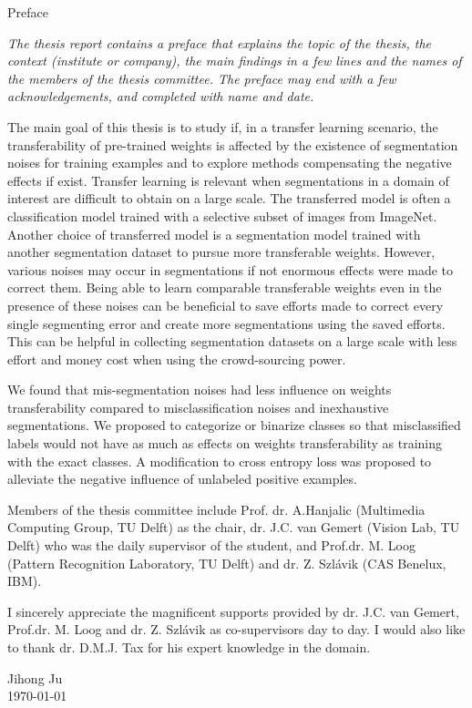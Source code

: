 Preface

\noindent \textit{The thesis report contains a preface that explains the topic of the thesis, the context (institute or company), the main findings in a few lines and the names of the members of the thesis committee. The preface may end with a few acknowledgements, and completed with name and date.}

The main goal of this thesis is to study if, in a transfer learning scenario, the transferability of pre-trained weights is affected by the existence of segmentation noises for training examples and to explore methods compensating the negative effects if exist.
Transfer learning is relevant when segmentations in a domain of interest are difficult to obtain on a large scale.
The transferred model is often a classification model trained with a selective subset of images from ImageNet.
Another choice of transferred model is a segmentation model trained with another segmentation dataset to pursue more transferable weights.
However, various noises may occur in segmentations if not enormous effects were made to correct them.
Being able to learn comparable transferable weights even in the presence of these noises can be beneficial to save efforts made to correct every single segmenting error and create more segmentations using the saved efforts.
This can be helpful in collecting segmentation datasets on a large scale with less effort and money cost when using the crowd-sourcing power.

We found that mis-segmentation noises had less influence on weights transferability compared to misclassification noises and inexhaustive segmentations.
We proposed to categorize or binarize classes so that misclassified labels would not have as much as effects on weights transferability as training with the exact classes.
A modification to cross entropy loss was proposed to alleviate the negative influence of unlabeled positive examples.

Members of the thesis committee include Prof. dr. A.Hanjalic (Multimedia Computing Group, TU Delft) as the chair, dr. J.C. van Gemert (Vision Lab, TU Delft) who was the daily supervisor of the student, and Prof.dr. M. Loog  (Pattern Recognition Laboratory, TU Delft) and dr. Z. Szlávik (CAS Benelux, IBM).

I sincerely appreciate the magnificent supports provided by dr. J.C. van Gemert, Prof.dr. M. Loog and dr. Z. Szlávik as co-supervisors day to day.
I would also like to thank dr. D.M.J. Tax for his expert knowledge in the domain.

\begin{flushright}
Jihong Ju\\
\today
\end{flushright}
